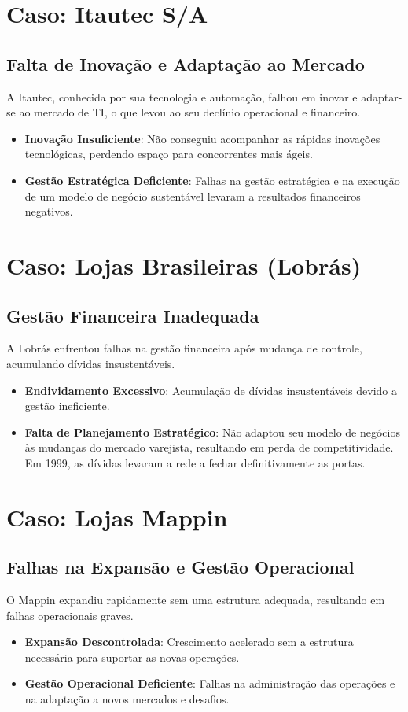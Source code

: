 \section{Caso: Itautec S/A}
\subsection*{Falta de Inovação e Adaptação ao Mercado}
A Itautec, conhecida por sua tecnologia e automação, falhou em inovar e adaptar-se ao mercado de TI, o que levou ao seu declínio operacional e financeiro.
\begin{itemize}
    \item \textbf{Inovação Insuficiente}: Não conseguiu acompanhar as rápidas inovações tecnológicas, perdendo espaço para concorrentes mais ágeis.
    \item \textbf{Gestão Estratégica Deficiente}: Falhas na gestão estratégica e na execução de um modelo de negócio sustentável levaram a resultados financeiros negativos.
\end{itemize}


\section{Caso: Lojas Brasileiras (Lobrás)}
\subsection*{Gestão Financeira Inadequada}
A Lobrás enfrentou falhas na gestão financeira após mudança de controle, acumulando dívidas insustentáveis.
\begin{itemize}
    \item \textbf{Endividamento Excessivo}: Acumulação de dívidas insustentáveis devido a gestão ineficiente.
    \item \textbf{Falta de Planejamento Estratégico}: Não adaptou seu modelo de negócios às mudanças do mercado varejista, resultando em perda de competitividade.
          Em 1999, as dívidas levaram a rede a fechar definitivamente as portas.
\end{itemize}



\section{Caso: Lojas Mappin}
\subsection*{Falhas na Expansão e Gestão Operacional}
O Mappin expandiu rapidamente sem uma estrutura adequada, resultando em falhas operacionais graves.
\begin{itemize}
    \item \textbf{Expansão Descontrolada}: Crescimento acelerado sem a estrutura necessária para suportar as novas operações.
    \item \textbf{Gestão Operacional Deficiente}: Falhas na administração das operações e na adaptação a novos mercados e desafios.
\end{itemize}

